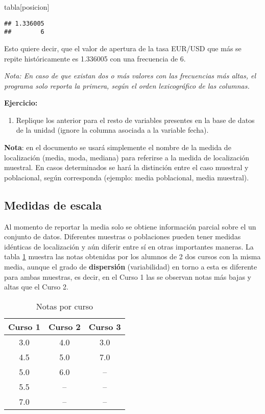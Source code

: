 \documentclass[
]{book}
\newenvironment{Shaded}{\begin{snugshade}}{\end{snugshade}}
\newcommand{\NormalTok}[1]{#1}
\providecommand{\tightlist}{%
  \setlength{\itemsep}{0pt}\setlength{\parskip}{0pt}}
\begin{document}
\begin{Shaded}
\begin{Highlighting}[]
\NormalTok{tabla[posicion]}
\end{Highlighting}
\end{Shaded}

\begin{verbatim}
## 1.336005 
##        6
\end{verbatim}

Esto quiere decir, que el valor de apertura de la tasa EUR/USD que más se repite históricamente es 1.336005 con una frecuencia de 6.

\emph{Nota: En caso de que existan dos o más valores con las frecuencias más altas, el programa solo reporta la primera, según el orden lexicográfico de las columnas.}

\textbf{Ejercicio:}

\begin{enumerate}
\def\labelenumi{\arabic{enumi}.}
\tightlist
\item
  Replique los anterior para el resto de variables presentes en la base de datos de la unidad (ignore la columna asociada a la variable fecha).
\end{enumerate}

\textbf{Nota}: en el documento se usará simplemente el nombre de la medida de localización (media, moda, mediana) para referirse a la medida de localización muestral. En casos determinados se hará la distinción entre el caso muestral y poblacional, según corresponda (ejemplo: media poblacional, media muestral).

\hypertarget{medidas-de-escala}{%
\subsection{Medidas de escala}\label{medidas-de-escala}}

Al momento de reportar la media solo se obtiene información parcial sobre el un conjunto de datos. Diferentes muestras o poblaciones pueden tener medidas idénticas de localización y aún diferir entre sí en otras importantes maneras. La tabla \ref{tab:variabilidad} muestra las notas obtenidas por los alumnos de 2 dos cursos con la misma media, aunque el grado de \textbf{dispersión} (variabilidad) en torno a esta es diferente para ambas muestras, es decir, en el Curso 1 las se observan notas más bajas y altas que el Curso 2.

\begin{table}

\caption{\label{tab:variabilidad}Notas por curso}
\centering
\begin{tabular}[t]{ccc}
\toprule
Curso 1 & Curso 2 & Curso 3\\
\midrule
3.0 & 4.0 & 3.0\\
4.5 & 5.0 & 7.0\\
5.0 & 6.0 & --\\
5.5 & -- & --\\
7.0 & -- & --\\
\bottomrule
\end{tabular}
\end{table}
\end{document}
